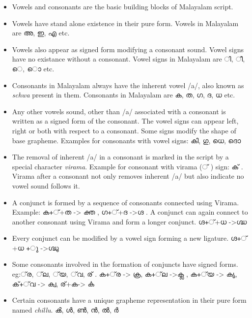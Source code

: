\documentclass[10pt]{article}
\begin{document}
\begin{itemize}
	\item
	Vowels and consonants are the basic building blocks of Malayalam script.
	\item
	Vowels have stand alone existence in their pure form. Vowels in Malayalam are {\manjari അ, ഇ, എ }etc.
	\item
	Vowels also appear as signed form modifying a consonant sound. Vowel signs have no existance without a consonant. Vowel signs in Malayalam are {\manjari  ി, ീ, െ, ൊ }etc.
	\item Consonants in Malayalam always have the inherent vowel /a/, also known as \textit{schwa} present in them. Consonants in Malayalam are {\manjari ക, ത, ഗ, ദ, ധ }etc.
	\item
	Any other vowels sound, other than /a/  associated with a consonant is written as a signed form of the consonant. The vowel signs can  appear left, right or both with respect to a consonant. Some signs modify the shape of base grapheme. Examples for consonants with vowel signs:  {\manjari കി, ഗു, ധെ, ദൊ} 
	\item 
	The removal of inherent /a/ in a consonant is marked in the script by a special character \textit{virama}. Example for consonant with virama (് ) sign: {\manjari ക് }. Virama after a consonant not only removes inherent /a/ but also indicate no vowel sound follows it. 
	\item
	A conjunct is formed by  a sequence of consonants connected using Virama. Example: {\manjari ക+്+ത -> ക്ത , ഗ+്+ദ ->ഗ്ദ }. A conjunct can again connect to another consonant using Virama and form a longer conjunct. {\manjari ഗ്ദ+്+ധ ->ഗ്ദ്ധ }
	\item	
	Every conjunct can be modified by a vowel sign forming a new ligature. 
	{\manjari ഗ്ദ+്+ധ +ു ->ഗ്ദ്ധു }
	\item
	Some consonants involved in the formation of conjuncts have signed forms. eg:{\manjari ്‌ര, ്‌ല, ്‌യ, ്‌വ, ര് . ക+്‌ര -> ക്ര, ക+്‌ല ->ക്ല , ക+്‌യ -> ക്യ, ക്+്‌വ -> ക്വ, ര്+ക-> ൎക}
	\item 
	Certain consonants have a unique grapheme representation in their pure form named \textit{chillu}. {\manjari ൿ, ൾ, ൺ, ൻ, ൽ, ർ }
\end{itemize}
\end{document}

